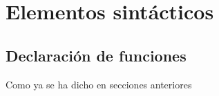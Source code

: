 			

	\section{Elementos sintácticos}



		\subsection{Declaración de funciones}

			Como ya se ha dicho en secciones anteriores


























